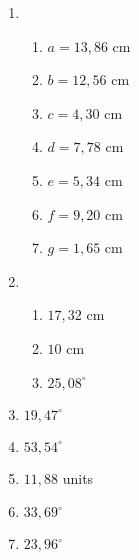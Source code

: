 {\begin{multicols}{3}
\begin{enumerate}[noitemsep, label=\textbf{\arabic*}. ]
\item %

    \begin{enumerate}[noitemsep, label=\textbf{(\alph*)} ]
\item$a=13,86$ cm
\item$b=12,56$ cm
\item$c=4,30$ cm
\item$d=7,78$ cm
\item$e=5,34$ cm
\item$f=9,20$ cm
\item$g=1,65$ cm
      \end{enumerate}
\item %
\begin{enumerate}[noitemsep, label=\textbf{(\alph*)} ]
\item $17,32$ cm%
\item $10$ cm%
\item $25,08^{\circ}$%
\end{enumerate} 
\item $19,47^{\circ}$%
\item $53,54^{\circ}$%

\item $11,88$ units%
 
\item $33,69^{\circ}$%
\item $23,96^{\circ}$%



\end{enumerate}
\end{multicols}}
